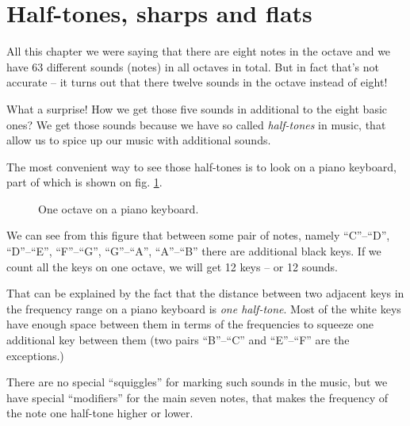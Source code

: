 \documentclass[../sparc.tex]{subfiles}
\begin{document}
\newpage
\section{Half-tones, sharps and flats}

All this chapter we were saying that there are eight notes in the octave and we
have 63 different sounds (notes) in all octaves in total.  But in fact that's
not accurate -- it turns out that there twelve sounds in the octave instead of
eight!

What a surprise!  How we get those five sounds in additional to the eight basic
ones?  We get those sounds because we have so called \emph{half-tones} in music,
that allow us to spice up our music with additional sounds.

The most convenient way to see those half-tones is to look on a piano keyboard,
part of which is shown on fig. \ref{fig:piano-keyboard}.

\begin{figure}[H]
  \centering
  \label{fig:piano-keyboard}
  \caption{One octave on a piano keyboard.}
\end{figure}

We can see from this figure that between some pair of notes, namely ``C''--``D'',
``D''--``E'', ``F''--``G'', ``G''--``A'', ``A''--``B'' there are additional black
keys.  If we count all the keys on one octave, we will get 12 keys -- or 12
sounds.

That can be explained by the fact that the distance between two adjacent keys in
the frequency range on a piano keyboard is \emph{one half-tone}.  Most of the
white keys have enough space between them in terms of the frequencies to squeeze
one additional key between them (two pairs ``B''--``C'' and ``E''--``F'' are the
exceptions.)

There are no special ``squiggles'' for marking such sounds in the music, but we
have special ``modifiers'' for the main seven notes, that makes the frequency of
the note one half-tone higher or lower.
\end{document}
